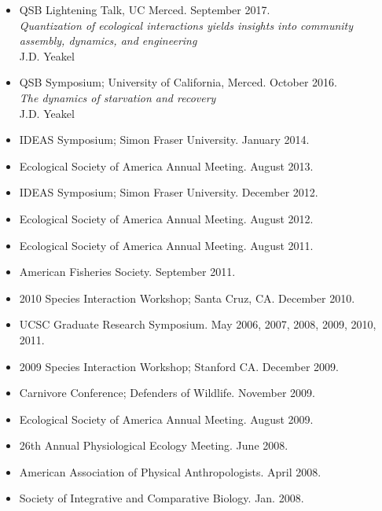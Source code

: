 \documentclass[margin,line,12pt]{res}
\begin{document}
\begin{resume}
\begin{itemize}
\item QSB Lightening Talk, UC Merced. September 2017.\\
\emph{Quantization of ecological interactions yields insights into community assembly, dynamics, and engineering}\\
J.D. Yeakel

\item QSB Symposium; University of California, Merced. October 2016.\\
\emph{The dynamics of starvation and recovery}\\
J.D. Yeakel

\item IDEAS Symposium; Simon Fraser University. January 2014.

\item Ecological Society of America Annual Meeting. August 2013.

\item IDEAS Symposium; Simon Fraser University. December 2012.

\item Ecological Society of America Annual Meeting. August 2012.

\item Ecological Society of America Annual Meeting. August 2011.

\item American Fisheries Society. September 2011.

\item 2010 Species Interaction Workshop; Santa Cruz, CA. December 2010.

\item UCSC Graduate Research Symposium. May 2006, 2007, 2008, 2009, 2010, 2011.

\item 2009 Species Interaction Workshop; Stanford CA. December 2009.

\item Carnivore Conference; Defenders of Wildlife. November 2009.

\item Ecological Society of America Annual Meeting. August 2009.

\item 26th Annual Physiological Ecology Meeting. June 2008.

\item American Association of Physical Anthropologists. April 2008.

\item Society of Integrative and Comparative Biology. Jan. 2008.


\end{itemize}
\end{resume}
\end{document}
